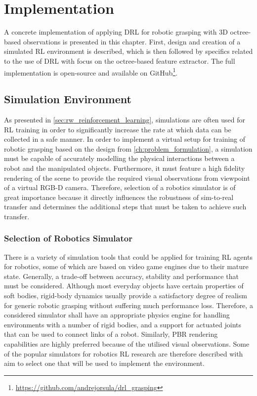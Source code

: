 \chapter{Implementation}\label{ch:implementation}

A concrete implementation of applying DRL for robotic grasping with 3D octree-based observations is presented in this chapter. First, design and creation of a simulated RL environment is described, which is then followed by specifics related to the use of DRL with focus on the octree-based feature extractor. The full implementation is open-source and available on GitHub\footnote{\href{https://github.com/andrejorsula/drl_grasping}{https://github.com/andrejorsula/drl\_grasping}}.


\section{Simulation Environment}\label{sec:impl_simulation_environment}

As presented in \autoref{sec:rw_reinforcement_learning}, simulations are often used for RL training in order to significantly increase the rate at which data can be collected in a safe manner. In order to implement a virtual setup for training of robotic grasping based on the design from \autoref{ch:problem_formulation}, a simulation must be capable of accurately modelling the physical interactions between a robot and the manipulated objects. Furthermore, it must feature a high fidelity rendering of the scene to provide the required visual observations from viewpoint of a virtual RGB-D camera. Therefore, selection of a robotics simulator is of great importance because it directly influences the robustness of sim-to-real transfer and determines the additional steps that must be taken to achieve such transfer.


\subsection{Selection of Robotics Simulator}

There is a variety of simulation tools that could be applied for training RL agents for robotics, some of which are based on video game engines due to their mature state. Generally, a trade-off between accuracy, stability and performance that must be considered. Although most everyday objects have certain properties of soft bodies, rigid-body dynamics usually provide a satisfactory degree of realism for generic robotic grasping without suffering much performance loss. Therefore, a considered simulator shall have an appropriate physics engine for handling environments with a number of rigid bodies, and a support for actuated joints that can be used to connect links of a robot. Similarly, PBR rendering capabilities are highly preferred because of the utilised visual observations. Some of the popular simulators for robotics RL research are therefore described with aim to select one that will be used to implement the environment.

